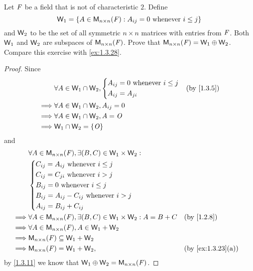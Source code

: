\begin{ex}\label{ex:1.3.29}
  Let \(\mathit{F}\) be a field that is not of characteristic \(2\).
  Define
  \[
    \mathsf{W}_1 = \left\lbrace A \in \mathsf{M}_{{n} \times n}({\mathit{F}}) : A_{i j} = 0 \text{ whenever } i \leq j\right\rbrace
  \]
  and \(\mathsf{W}_2\) to be the set of all symmetric \(n \times n\) matrices with entries from \(\mathit{F}\).
  Both \(\mathsf{W}_1\) and \(\mathsf{W}_2\) are subspaces of \(\mathsf{M}_{{n} \times n}({\mathit{F}})\).
  Prove that \(\mathsf{M}_{{n} \times n}({\mathit{F}}) = \mathsf{W}_1 \oplus \mathsf{W}_2\).
  Compare this exercise with \cref{ex:1.3.28}.
\end{ex}

\begin{proof}
  Since
  \begin{align*}
             & \forall A \in \W_1 \cap \W_2, \begin{dcases}
      A_{i j} = 0 \text{ whenever } i \leq j \\
      A_{i j} = A_{j i}
    \end{dcases} &  & \text{(by \cref{1.3.5})} \\
    \implies & \forall A \in \W_1 \cap \W_2, A_{i j} = 0                                              \\
    \implies & \forall A \in \W_1 \cap \W_2, A = \zm                                                  \\
    \implies & \W_1 \cap \W_2 = \set{\zm}
  \end{align*}
  and
  \begin{align*}
             & \forall A \in \ms{n}{n}{\F}, \exists (B, C) \in \W_1 \times \W_2 :                                                \\
             & \begin{dcases}
      C_{i j} = A_{i j} \text{ whenever } i \leq j        \\
      C_{i j} = C_{j i} \text{ whenever } i > j           \\
      B_{i j} = 0 \text{ whenever } i \leq j              \\
      B_{i j} = A_{i j} - C_{i j} \text{ whenever } i > j \\
      A_{i j} = B_{i j} + C_{i j}
    \end{dcases}                                                                                        \\
    \implies & \forall A \in \ms{n}{n}{\F}, \exists (B, C) \in \W_1 \times \W_2 : A = B + C &  & \text{(by \cref{1.2.8})}        \\
    \implies & \forall A \in \ms{n}{n}{\F}, A \in \W_1 + \W_2                                                                    \\
    \implies & \ms{n}{n}{\F} \subseteq \W_1 + \W_2                                                                               \\
    \implies & \ms{n}{n}{\F} = \W_1 + \W_2,                                                 &  & \text{(by \cref{ex:1.3.23}(a))}
  \end{align*}
  by \cref{1.3.11} we know that \(\mathsf{W}_1 \oplus \mathsf{W}_2 = \mathsf{M}_{{n} \times n}({\mathit{F}})\).
\end{proof}

